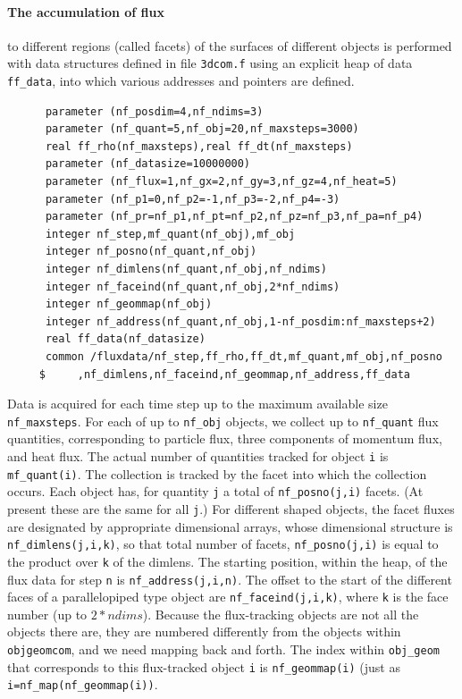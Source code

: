 \documentclass[12pt]{article}
\begin{document}
\paragraph{The accumulation of flux} to different regions (called facets) of the
surfaces of different objects is performed with data structures
defined in file \verb!3dcom.f! using an explicit heap of data
\verb!ff_data!, into which various addresses and pointers are defined.
\begin{verbatim}
      parameter (nf_posdim=4,nf_ndims=3)
      parameter (nf_quant=5,nf_obj=20,nf_maxsteps=3000)
      real ff_rho(nf_maxsteps),real ff_dt(nf_maxsteps)
      parameter (nf_datasize=10000000)
      parameter (nf_flux=1,nf_gx=2,nf_gy=3,nf_gz=4,nf_heat=5)
      parameter (nf_p1=0,nf_p2=-1,nf_p3=-2,nf_p4=-3)
      parameter (nf_pr=nf_p1,nf_pt=nf_p2,nf_pz=nf_p3,nf_pa=nf_p4)
      integer nf_step,mf_quant(nf_obj),mf_obj
      integer nf_posno(nf_quant,nf_obj)
      integer nf_dimlens(nf_quant,nf_obj,nf_ndims)
      integer nf_faceind(nf_quant,nf_obj,2*nf_ndims)
      integer nf_geommap(nf_obj)
      integer nf_address(nf_quant,nf_obj,1-nf_posdim:nf_maxsteps+2)
      real ff_data(nf_datasize)
      common /fluxdata/nf_step,ff_rho,ff_dt,mf_quant,mf_obj,nf_posno
     $     ,nf_dimlens,nf_faceind,nf_geommap,nf_address,ff_data
\end{verbatim}
Data is acquired for each time step up to the maximum available size
\verb!nf_maxsteps!. For each of up to \verb!nf_obj! objects, we
collect up to \verb!nf_quant! flux quantities, corresponding to
particle flux, three components of momentum flux, and heat flux. The
actual number of quantities tracked for object \verb!i! is
\verb!mf_quant(i)!.  The collection is tracked by the facet into which
the collection occurs. Each object has, for quantity \verb!j! a total
of \verb!nf_posno(j,i)! facets. (At present these are the same for all
\verb!j!.) For different shaped objects, the facet fluxes are
designated by appropriate dimensional arrays, whose dimensional
structure is \verb!nf_dimlens(j,i,k)!, so that total number of facets,
\verb!nf_posno(j,i)! is equal to the product over \verb!k! of the dimlens.
The starting position, within the heap, of the flux data for step \verb!n! is 
\verb!nf_address(j,i,n)!. The offset to the start of the different
faces of a parallelopiped type object are \verb!nf_faceind(j,i,k)!,
where \verb!k! is the face number (up to $2*ndims$).
Because the flux-tracking objects are not all the objects there are,
they are numbered differently from the objects within
\verb!objgeomcom!, and we need mapping back and forth. 
The index within \verb!obj_geom! that
corresponds to this flux-tracked object \verb!i! is
\verb!nf_geommap(i)! (just as \verb!i=nf_map(nf_geommap(i))!.
\end{document}

